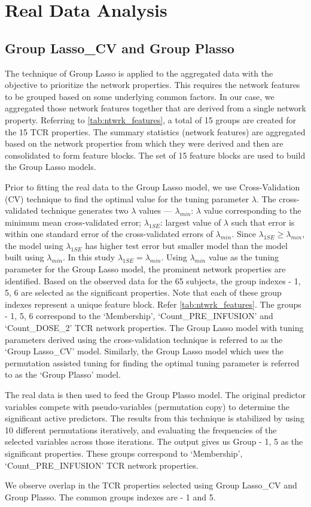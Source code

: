\section{Real Data Analysis}\label{sec:real_data_analysis}
\subsection{Group Lasso\_CV and Group Plasso}\label{subsec:grp_cv_plasso}
The technique of Group Lasso is applied to the aggregated data with the objective to prioritize the network properties. This requires the network features to be grouped based on some underlying common factors. In our case, we aggregated those network features together that are derived from a single network property. Referring to \autoref{tab:ntwrk_features}, a total of 15 groups are created for the 15 TCR properties. The summary statistics (network features) are aggregated based on the network properties from which they were derived and then are consolidated to form feature blocks. The set of 15 feature blocks are used to build the Group Lasso models.\par
Prior to fitting the real data to the Group Lasso model, we use Cross-Validation (CV) technique to find the optimal value for the tuning parameter $\lambda$. The cross-validated technique generates two $\lambda$ values --- $\lambda_{min}$: $\lambda$ value corresponding to the minimum mean cross-validated error; $\lambda_{1SE}$: largest value of $\lambda$ such that error is within one standard error of the cross-validated errors of $\lambda_{min}$. Since $\lambda_{1SE}\ge \lambda_{min}$, the model using $\lambda_{1SE}$ has higher test error but smaller model than the model built using $\lambda_{min}$. In this study $\lambda_{1SE}=\lambda_{min}$. Using $\lambda_{min}$ value as the tuning parameter for the Group Lasso model, the prominent network properties are identified. Based on the observed data for the 65 subjects, the group indexes - 1, 5, 6 are selected as the significant properties. Note that each of these group indexes represent a unique feature block. Refer \autoref{tab:ntwrk_features}. The groups - 1, 5, 6 correspond to the \lq Membership', \lq Count\_PRE\_INFUSION' and \lq Count\_DOSE\_2' TCR network properties. The Group Lasso model with tuning parameters derived using the cross-validation technique is referred to as the \lq Group Lasso\_CV' model.
Similarly, the Group Lasso model which uses the permutation assisted tuning for finding the optimal tuning parameter is referred to as the \lq Group Plasso' model.\par
The real data is then used to feed the Group Plasso model. The original predictor variables compete with pseudo-variables (permutation copy) to determine the significant active predictors. The results from this technique is stabilized by using 10 different permutations iteratively, and evaluating the frequencies of the selected variables across those iterations. The output gives us Group - 1, 5 as the significant properties. These groups correspond to \lq Membership', \lq Count\_PRE\_INFUSION' TCR network properties.\par
We observe overlap in the TCR properties selected using Group Lasso\_CV and Group Plasso. The common groups indexes are - 1 and 5.
